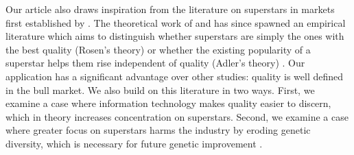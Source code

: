\documentclass[12pt,letterpaper]{article}
\begin{document}
Our article also draws inspiration from the literature on superstars in markets first established by \citet{rosen_economics_1981}. The theoretical work of \citet{rosen_economics_1981} and \citet{adler1985stardom} has since spawned an empirical literature which aims to distinguish whether superstars are simply the ones with the best quality (Rosen's theory) or whether the existing popularity of a superstar helps them rise independent of quality (Adler's theory) \citep{gergaud_untalented_2021,franck_talent_2012,filimon2011test}. Our application has a significant advantage over other studies: quality is well defined in the bull market. We also build on this literature in two ways. First, we examine a case where information technology makes quality easier to discern, which in theory increases concentration on superstars. Second, we examine a case where greater focus on superstars harms the industry by eroding genetic diversity, which is necessary for future genetic improvement \citep{makanjuola_effect_2020,scott_how_2021,Cole2023}.



\end{document}

